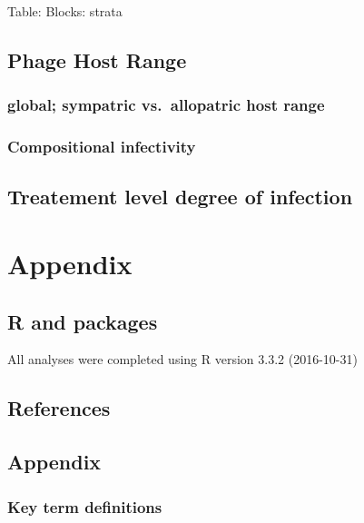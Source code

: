 \documentclass[]{article}
\begin{document}
Table: Blocks: strata

\newpage

\subsection{Phage Host Range}\label{phage-host-range}

\subsubsection{global; sympatric vs.~allopatric host
range}\label{global-sympatric-vs.allopatric-host-range}

\newpage

\subsubsection{Compositional
infectivity}\label{compositional-infectivity}

\newpage

\subsection{Treatement level degree of
infection}\label{treatement-level-degree-of-infection}

\newpage

\section{Appendix}\label{appendix}

\subsection{R and packages}\label{r-and-packages}

All analyses were completed using R version 3.3.2 (2016-10-31)

\newpage

\subsection{References}\label{references}

\newpage

\subsection{Appendix}\label{appendix-1}

\subsubsection{Key term definitions}\label{key-term-definitions}
\end{document}
